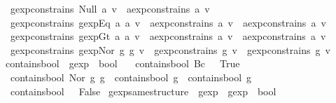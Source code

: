 \begin{isabellebody}
\ \ {\isachardoublequoteopen}gexp{\isacharunderscore}constrains\ {\isacharparenleft}Null\ a{\isacharparenright}\ v\ {\isacharequal}\ aexp{\isacharunderscore}constrains\ a\ v{\isachardoublequoteclose}\ {\isacharbar}\isanewline
\ \ {\isachardoublequoteopen}gexp{\isacharunderscore}constrains\ {\isacharparenleft}gexp{\isachardot}Eq\ a{}\ a{}{\isacharparenright}\ v\ {\isacharequal}\ {\isacharparenleft}aexp{\isacharunderscore}constrains\ a{}\ v\ {\isasymor}\ aexp{\isacharunderscore}constrains\ a{}\ v{\isacharparenright}{\isachardoublequoteclose}\ {\isacharbar}\isanewline
\ \ {\isachardoublequoteopen}gexp{\isacharunderscore}constrains\ {\isacharparenleft}gexp{\isachardot}Gt\ a{}\ a{}{\isacharparenright}\ v\ {\isacharequal}\ {\isacharparenleft}aexp{\isacharunderscore}constrains\ a{}\ v\ {\isasymor}\ aexp{\isacharunderscore}constrains\ a{}\ v{\isacharparenright}{\isachardoublequoteclose}\ {\isacharbar}\isanewline
\ \ {\isachardoublequoteopen}gexp{\isacharunderscore}constrains\ {\isacharparenleft}gexp{\isachardot}Nor\ g{}\ g{}{\isacharparenright}\ v\ {\isacharequal}\ {\isacharparenleft}gexp{\isacharunderscore}constrains\ g{}\ v\ {\isasymor}\ gexp{\isacharunderscore}constrains\ g{}\ v{\isacharparenright}{\isachardoublequoteclose}\isanewline
\isanewline
{}\isamarkupfalse%
\ contains{\isacharunderscore}bool\ {\isacharcolon}{\isacharcolon}\ {\isachardoublequoteopen}gexp\ {\isasymRightarrow}\ bool{\isachardoublequoteclose}\ \isanewline
\ \ {\isachardoublequoteopen}contains{\isacharunderscore}bool\ {\isacharparenleft}Bc\ {\isacharunderscore}{\isacharparenright}\ {\isacharequal}\ True{\isachardoublequoteclose}\ {\isacharbar}\isanewline
\ \ {\isachardoublequoteopen}contains{\isacharunderscore}bool\ {\isacharparenleft}Nor\ g{}\ g{}{\isacharparenright}\ {\isacharequal}\ {\isacharparenleft}contains{\isacharunderscore}bool\ g{}\ {\isasymor}\ contains{\isacharunderscore}bool\ g{}{\isacharparenright}{\isachardoublequoteclose}\ {\isacharbar}\isanewline
\ \ {\isachardoublequoteopen}contains{\isacharunderscore}bool\ {\isacharunderscore}\ {\isacharequal}\ False{\isachardoublequoteclose}\isanewline
\isanewline
{}\isamarkupfalse%
\ gexp{\isacharunderscore}same{\isacharunderscore}structure\ {\isacharcolon}{\isacharcolon}\ {\isachardoublequoteopen}gexp\ {\isasymRightarrow}\ gexp\ {\isasymRightarrow}\ bool{\isachardoublequoteclose}\ \isanewline

\end{isabellebody}
